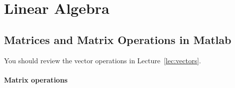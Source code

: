 \part{Linear Algebra}


\chapter{Matrices and Matrix Operations in Matlab}


You should review the vector operations in Lecture~\ref{lec:vectors}.

\subsection*{Matrix operations}

